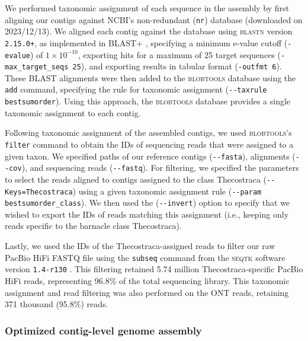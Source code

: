 We performed taxonomic assignment of each sequence in the assembly by first aligning
our contigs against NCBI's non-redundant (\texttt{nr}) database (downloaded on
2023/12/13). We aligned each contig against the database using \textsc{blastn} version
\texttt{2.15.0+}, as implemented in \textsc{BLAST+} \citep{camacho_blast_2009},
specifying a minimum e-value cutoff (\texttt{-evalue}) of $1\times10^{-10}$, exporting
hits for a maximum of 25 target sequences (\texttt{-max\_target\_seqs 25}), and exporting
results in tabular format (\texttt{-outfmt 6}). These \textsc{BLAST} alignments
were then added to the \textsc{blobtools} database using the \texttt{add} command,
specifying the rule for taxonomic assignment (\texttt{-{}-taxrule bestsumorder}).
Using this approach, the \textsc{blobtools} database provides a single taxonomic
assignment to each contig.
\vspace{0.1cm}

Following taxonomic assignment of the assembled contigs, we used
\textsc{blobtools}'s \texttt{filter} command to obtain the IDs of sequencing
reads that were assigned to a given taxon. We specified paths of our reference
contigs (\texttt{-{}-fasta}), alignments (\texttt{-{}-cov}), and sequencing reads
(\texttt{-{}-fastq}). For filtering, we specified the parameters to select the reads
aligned to contigs assigned to the class Thecostraca (\texttt{-{}-Keys=Thecostraca})
using a given taxonomic assignment rule (\texttt{-{}-param bestsumorder\_class}). We
then used the (\texttt{-{}-invert}) option to specify that we wished to export the
IDs of reads matching this assignment (i.e., keeping only reads specific to the
barnacle class Thecostraca).
\vspace{0.1cm}

Lastly, we used the IDs of the Thecostraca-assigned reads to filter our raw
PacBio HiFi FASTQ file using the \texttt{subseq} command from the \textsc{seqtk}
software version \texttt{1.4-r130} \citep{li_seqtk}. This
filtering retained 5.74 million Thecostraca-specific PacBio HiFi reads, representing
96.8\% of the total sequencing library. This taxonomic assignment and read
filtering was also performed on the ONT reads, retaining 371 thousand (95.8\%)
reads.

\subsubsection*{Optimized contig-level genome assembly}\label{sec:methods_optimized_assembly}

